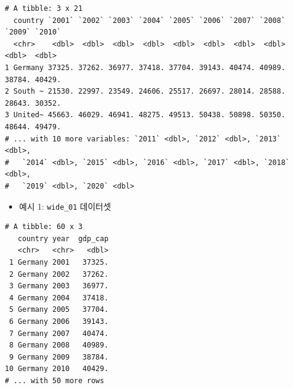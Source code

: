 \documentclass[
  11pt,
]{krantz}
\newenvironment{Shaded}{\begin{snugshade}}{\end{snugshade}}
\newcommand{\CommentTok}[1]{\textcolor[rgb]{0.37,0.37,0.37}{\textit{#1}}}
\newcommand{\DataTypeTok}[1]{\textcolor[rgb]{0.27,0.27,0.27}{#1}}
\newcommand{\DecValTok}[1]{\textcolor[rgb]{0.06,0.06,0.06}{#1}}
\newcommand{\KeywordTok}[1]{\textcolor[rgb]{0.27,0.27,0.27}{\textbf{#1}}}
\newcommand{\NormalTok}[1]{#1}
\newcommand{\OperatorTok}[1]{\textcolor[rgb]{0.43,0.43,0.43}{\textbf{#1}}}
\newcommand{\StringTok}[1]{\textcolor[rgb]{0.5,0.5,0.5}{#1}}
\providecommand{\tightlist}{%
  \setlength{\itemsep}{0pt}\setlength{\parskip}{0pt}}
\begin{document}
\begin{verbatim}
# A tibble: 3 x 21
  country `2001` `2002` `2003` `2004` `2005` `2006` `2007` `2008` `2009` `2010`
  <chr>    <dbl>  <dbl>  <dbl>  <dbl>  <dbl>  <dbl>  <dbl>  <dbl>  <dbl>  <dbl>
1 Germany 37325. 37262. 36977. 37418. 37704. 39143. 40474. 40989. 38784. 40429.
2 South ~ 21530. 22997. 23549. 24606. 25517. 26697. 28014. 28588. 28643. 30352.
3 United~ 45663. 46029. 46941. 48275. 49513. 50438. 50898. 50350. 48644. 49479.
# ... with 10 more variables: `2011` <dbl>, `2012` <dbl>, `2013` <dbl>,
#   `2014` <dbl>, `2015` <dbl>, `2016` <dbl>, `2017` <dbl>, `2018` <dbl>,
#   `2019` <dbl>, `2020` <dbl>
\end{verbatim}

\normalsize

\begin{itemize}
\tightlist
\item
  예시 1: \texttt{wide\_01} 데이터셋
\end{itemize}

\footnotesize

\begin{Shaded}
\end{Shaded}

\begin{verbatim}
# A tibble: 60 x 3
   country year  gdp_cap
   <chr>   <chr>   <dbl>
 1 Germany 2001   37325.
 2 Germany 2002   37262.
 3 Germany 2003   36977.
 4 Germany 2004   37418.
 5 Germany 2005   37704.
 6 Germany 2006   39143.
 7 Germany 2007   40474.
 8 Germany 2008   40989.
 9 Germany 2009   38784.
10 Germany 2010   40429.
# ... with 50 more rows
\end{verbatim}

\begin{Shaded}
\end{Shaded}
\end{document}
